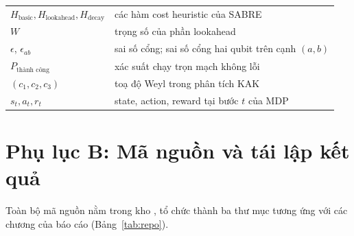 \begin{table}[h]
\begin{tabular}{@{}ll@{}}
    $H_{\text{basic}}, H_{\text{lookahead}}, H_{\text{decay}}$ & các hàm cost heuristic của SABRE \\
    $W$ & trọng số của phần lookahead \\
    $\epsilon$, $\epsilon_{ab}$ & sai số cổng; sai số cổng hai qubit trên cạnh $(a,b)$ \\
    $P_{\text{thành công}}$ & xác suất chạy trọn mạch không lỗi \\
    $(c_1, c_2, c_3)$ & toạ độ Weyl trong phân tích KAK \\
    $s_t, a_t, r_t$ & state, action, reward tại bước $t$ của MDP \\
    \bottomrule
  \end{tabular}
\end{table}

\section*{Phụ lục B: Mã nguồn và tái lập kết quả}
\label{app:repo}

Toàn bộ mã nguồn nằm trong kho , tổ chức thành ba thư mục tương ứng với các
chương của báo cáo (Bảng~\ref{tab:repo}).


